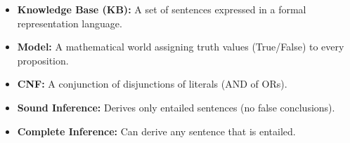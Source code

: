 \documentclass[12pt,a4paper]{article}
\begin{document}
\begin{tcolorbox}[defbox, title={\textbf{One-Line Definitions}}]
  \begin{itemize}[leftmargin=*, noitemsep]
    \item \textbf{Knowledge Base (KB):} A set of sentences expressed in a formal representation language.
    \item \textbf{Model:} A mathematical world assigning truth values (True/False) to every proposition.
    \item \textbf{CNF:} A conjunction of disjunctions of literals (AND of ORs).
    \item \textbf{Sound Inference:} Derives only entailed sentences (no false conclusions).
    \item \textbf{Complete Inference:} Can derive any sentence that is entailed.
  \end{itemize}
\end{tcolorbox}
\end{document}
